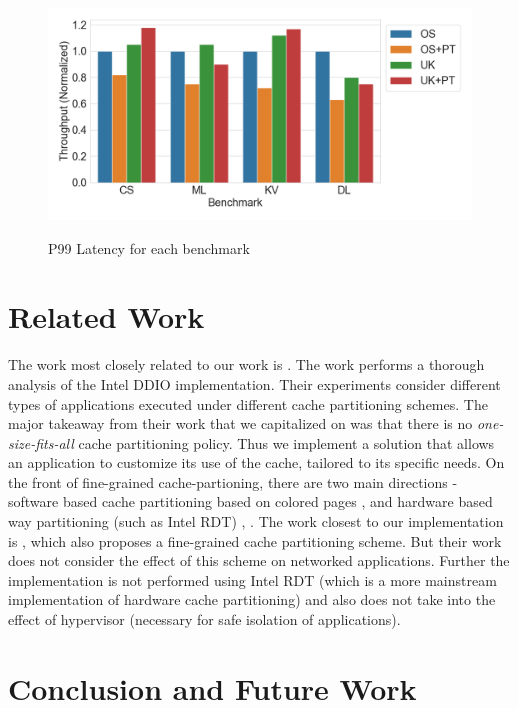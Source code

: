 \documentclass[sigconf,authorversion,noacm]{acmart}
\begin{document}
\begin{figure}[h]
  \centering
  \includegraphics[width=\linewidth]{res3}
    \label{fig:motivating}
    \vspace{-2em}
    \caption{P99 Latency for each benchmark}
\end{figure}

\section{Related Work}
The work most closely related to our work is \cite{alireza_2020}. The work
performs a thorough analysis of the Intel DDIO implementation. Their experiments
consider different types of applications executed under different cache
partitioning schemes. The major takeaway from their work that we capitalized on
was that there is no \textit{one-size-fits-all} cache partitioning policy. Thus
we implement a solution that allows an application to customize its use of the
cache, tailored to its specific needs. On the front of fine-grained
cache-partioning, there are two main directions - software based cache
partitioning based on colored pages \cite{herter}, \cite{sherwood} and hardware
based way partitioning (such as Intel RDT) \cite{chen}, \cite{assaf}. The work
closest to our implementation is \cite{swap}, which also proposes a fine-grained
cache partitioning scheme. But their work does not consider the effect of this
scheme on networked applications. Further the implementation is not performed
using Intel RDT (which is a more mainstream implementation of hardware cache
partitioning) and also does not take into the effect of hypervisor (necessary
for safe isolation of applications).

\section{Conclusion and Future Work}
\end{document}
